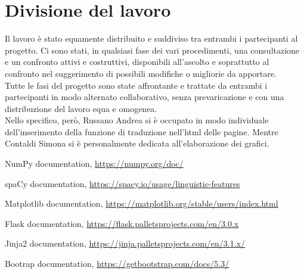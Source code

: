 \documentclass[11pt]{article}
\begin{document}
\section{Divisione del lavoro} Il lavoro è stato equamente distribuito e suddiviso tra entrambi i partecipanti al progetto. Ci sono stati, in qualsiasi fase dei vari procedimenti, una consultazione e un confronto attivi e costruttivi, disponibili all'ascolto e soprattutto al confronto nel suggerimento di possibili modifiche o migliorie da apportare.\\
Tutte le fasi del progetto sono state affrontante e trattate da entrambi i partecipanti in modo alternato collaborativo, senza prevaricazione e con una distribuzione del lavoro equa e omogenea.\\
Nello specifico, però, Russano Andrea si è occupato in modo individuale dell'inserimento della funzione di traduzione nell'html delle pagine. Mentre Contaldi Simona si è personalmente dedicata all'elaborazione dei grafici. 

\begin{thebibliography}{}

NumPy documentation, \url{https://numpy.org/doc/}

spaCy documentation, \url{https://spacy.io/usage/linguistic-features}

Matplotlib documentation, \url{https://matplotlib.org/stable/users/index.html}

Flask documentation, \url{https://flask.palletsprojects.com/en/3.0.x}

Jinja2 documentation, \url{https://jinja.palletsprojects.com/en/3.1.x/}

Bootrap documentation, \url{https://getbootstrap.com/docs/5.3/}

\end{thebibliography}
\end{document}

